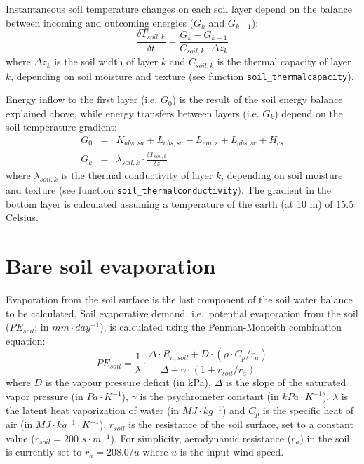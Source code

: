\documentclass[]{book}
\begin{document}
Instantaneous soil temperature changes on each soil layer depend on the balance between incoming and outcoming energies (\(G_k\) and \(G_{k-1}\)):
\begin{equation}
\frac{\delta T_{soil,k}}{\delta t} = \frac{G_k - G_{k-1}}{C_{soil,k} \cdot \Delta z_k}
\end{equation}
where \(\Delta z_k\) is the soil width of layer \(k\) and \(C_{soil,k}\) is the thermal capacity of layer \(k\), depending on soil moisture and texture (see function \texttt{soil\_thermalcapacity}).

Energy inflow to the first layer (i.e. \(G_0\)) is the result of the soil energy balance explained above, while energy transfers between layers (i.e. \(G_k\)) depend on the soil temperature gradient:
\begin{eqnarray}
G_0 &=& K_{abs,sa} + L_{abs,sa} - L_{em,s} + L_{abs,sc} + H_{cs}\\
G_k &=& \lambda_{soil,k} \cdot \frac{\delta T_{soil,k}}{\delta z}
\end{eqnarray}
where \(\lambda_{soil,k}\) is the thermal conductivity of layer \(k\), depending on soil moisture and texture (see function \texttt{soil\_thermalconductivity}). The gradient in the bottom layer is calculated assuming a temperature of the earth (at 10 m) of 15.5 Celsius.

\hypertarget{bare-soil-evaporation-1}{%
\section{Bare soil evaporation}\label{bare-soil-evaporation-1}}

Evaporation from the soil surface is the last component of the soil water balance to be calculated. Soil evaporative demand, i.e.~potential evaporation from the soil (\(PE_{soil}\); in \(mm\cdot day^{-1}\)), is calculated using the Penman-Monteith combination equation:
\begin{equation}
PE_{soil} = \frac{1}{\lambda} \cdot \frac{\Delta \cdot R_{n,soil} + D \cdot (\rho \cdot C_p/r_a)}{\Delta + \gamma \cdot (1 + r_{soil}/r_a)}
\end{equation}
where \(D\) is the vapour pressure deficit (in kPa), \(\Delta\) is the slope of the saturated vapor pressure (in \(Pa \cdot K^{-1}\)), \(\gamma\) is the psychrometer constant (in \(kPa\cdot K^{-1}\)), \(\lambda\) is the latent heat vaporization of water (in \(MJ\cdot kg^{-1}\)) and \(C_p\) is the specific heat of air (in \(MJ\cdot kg^{-1}\cdot K^{-1}\)). \(r_{soil}\) is the resistance of the soil surface, set to a constant value (\(r_{soil} = 200\) \(s\cdot m^{-1}\)). For simplicity, aerodynamic resistance (\(r_a\)) in the soil is currently set to \(r_a = 208.0/u\) where \(u\) is the input wind speed.
\end{document}

